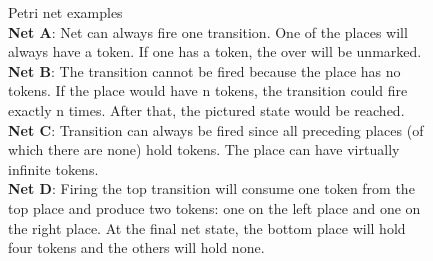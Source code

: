 \begin{figure}
  \caption{
    Petri net examples\\
    \textbf{Net A}: Net can always fire one transition. One of the places will always have a token. If one has a token, the over will be unmarked.\\
    \textbf{Net B}: The transition cannot be fired because the place has no tokens. If the place would have n tokens, the transition could fire exactly n times. After that, the pictured state would be reached.\\
    \textbf{Net C}: Transition can always be fired since all preceding places (of which there are none) hold tokens. The place can have virtually infinite tokens.\\
    \textbf{Net D}: Firing the top transition will consume one token from the top place and produce two tokens: one on the left place and one on the right place. At the final net state, the bottom place will hold four tokens and the others will hold none.
    }
    \label{petrNetExamples}
\end{figure}